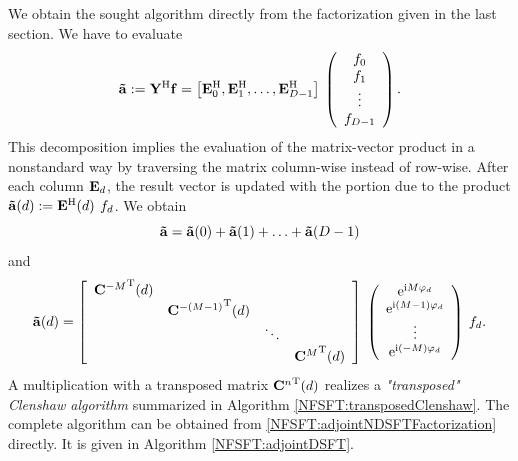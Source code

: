 We obtain the sought algorithm directly from the factorization given in the last section. We have to evaluate
$$
  \mathbf{\tilde{a}}
  :=
  \mathbf{Y}^{\text{\rm{H}}} \mathbf{f}
  = 
  \left[
    \mathbf{E}_{0}^{\text{\rm{H}}},
    \mathbf{E}_{1}^{\text{\rm{H}}},
    \ldots,
    \mathbf{E}_{D-1}^{\text{\rm{H}}}
  \right]
  \:
  \left(\begin{array}{c}
    f_{0}\\
    f_{1}\\
    \vdots\\
    f_{D-1}
  \end{array}\right). 
$$
This decomposition implies the evaluation of the matrix-vector product in a nonstandard way by traversing the 
matrix column-wise instead of row-wise. After each column $\mathbf{E}_{d}$, the result vector is updated with the portion due 
to the product $\mathbf{\tilde{a}}{\hspace{-0.4ex}}\left(d\right) := \mathbf{E}^{\text{\rm{H}}}{\hspace{-0.4ex}}\left(d\right) \: f_{d}$. We obtain
\begin{equation}
  \nonumber
  \mathbf{\tilde{a}} = \mathbf{\tilde{a}}{\hspace{-0.4ex}}\left(0\right) + \mathbf{\tilde{a}}{\hspace{-0.4ex}}\left(1\right) + \ldots + \mathbf{\tilde{a}}{\hspace{-0.4ex}}\left(D-1\right)
\end{equation}
and
\begin{equation}
  \label{NFSFT:adjointNDSFTFactorization}
  \mathbf{\tilde{a}}{\hspace{-0.4ex}}\left(d\right)
  =
  \left[\begin{array}{cccc}
    {\mathbf{C}^{-M}}^{\text{\rm{T}}}{\hspace{-0.4ex}}\left(d\right) &                                     &        &                               \\
                                    & {\mathbf{C}^{-(M-1)}}^{\text{\rm{T}}}{\hspace{-0.4ex}}\left(d\right) &        &                               \\
                                    &                                     & \ddots &                               \\
                                    &                                     &        & {\mathbf{C}^{M}}^{\text{\rm{T}}}{\hspace{-0.4ex}}\left(d\right) 
  \end{array}\right]
  \:
  \left(\begin{array}{c}
    \mbox{\rm{e}}^{\mbox{\scriptsize\rm{i}} M \varphi_{d}}\\
    \mbox{\rm{e}}^{\mbox{\scriptsize\rm{i}} (M-1) \varphi_{d}}\\
    \vdots\\
    \mbox{\rm{e}}^{\mbox{\scriptsize\rm{i}} (-M) \varphi_{d}}
  \end{array}\right)
  \:
  f_{d}.
\end{equation}
A multiplication with a transposed matrix ${\mathbf{C}^{n}}^{\text{\rm{T}}}{\hspace{-0.4ex}}\left(d\right)$ realizes a \emph{"transposed" Clenshaw algorithm} summarized in Algorithm \ref{NFSFT:transposedClenshaw}. The complete algorithm can be obtained from \eqref{NFSFT:adjointNDSFTFactorization} directly. It is given in Algorithm \ref{NFSFT:adjointDSFT}.
